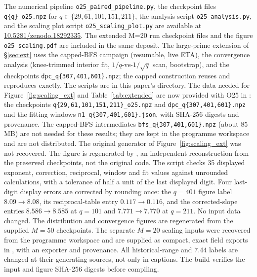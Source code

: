 \documentclass[11pt,a4paper]{article}
\theoremstyle{definition}
\begin{document}
    The numerical pipeline \texttt{o25\_paired\_pipeline.py}, the checkpoint files
    \texttt{q\{q\}\_o25.npz} for $q \in \{29, 61, 101, 151, 211\}$, the analysis
    script \texttt{o25\_analysis.py}, and the scaling plot script
    \texttt{o25\_scaling\_plot.py} are available at
    \href{https://doi.org/10.5281/zenodo.18292335}{10.5281/zenodo.18292335}.
    The extended M=20 run checkpoint files and the figure \texttt{o25\_scaling.pdf}
    are included in the same deposit.
    The large-prime extension of \S\ref{sec:ext} uses the capped-BFS campaign
     (resumable, live ETA), the convergence analysis
     (knee-trimmed interior fit, $1/q$-vs-$1/\sqrt{q}$ scan,
    bootstrap), and the checkpoints \texttt{dpc\_q\{307,401,601\}.npz}; the capped construction
    reuses  and reproduces  exactly.
    The scripts are in this paper's  directory.
    The data needed for Figure~\ref{fig:scaling_ext} and Table~\ref{tab:extended} are now provided
    with O25 in : the checkpoints \texttt{q\{29,61,101,151,211\}\_o25.npz}
    and \texttt{dpc\_q\{307,401,601\}.npz} and the fitting windows \texttt{n1\_q\{307,401,601\}.json},
    with SHA-256 digests and provenance.
    The capped-BFS intermediates \texttt{bfs\_q\{307,401,601\}.npz} (about 85\,MB) are not needed
    for these results; they are kept in the programme workspace 
    and are not distributed.
    The original generator of Figure~\ref{fig:scaling_ext} was not recovered.
    The figure is regenerated by , an independent
    reconstruction from the preserved checkpoints, not the original code.
    The script checks 35 displayed exponent, correction, reciprocal, window and fit values
    against unrounded calculations, with a tolerance of half a unit of the last displayed digit.
    Four last-digit display errors are corrected by rounding once: the $q=401$ figure label
    $8.09\to8.08$, its reciprocal-table entry $0.117\to0.116$, and the corrected-slope entries
    $8.586\to8.585$ at $q=101$ and $7.771\to7.770$ at $q=211$.
    No input data changed.
    The distribution and convergence figures are regenerated from the supplied $M=50$ checkpoints.
    The separate $M=20$ scaling inputs were recovered from the programme workspace and are supplied
    as compact, exact field exports in , with an exporter and provenance.
    All historical-range and $7.44$ labels are changed at their generating sources, not only in captions.
    The build verifies the input and figure SHA-256 digests before compiling.
\end{document}

